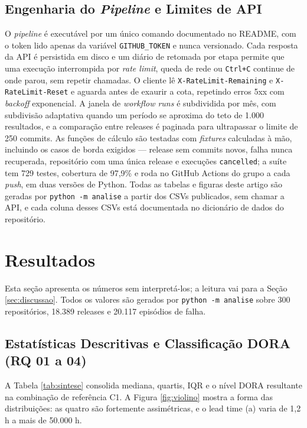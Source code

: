 \documentclass[12pt]{article}
\begin{document}
\subsection{Engenharia do \emph{Pipeline} e Limites de API}

O \emph{pipeline} é executável por um único comando documentado no README, com o token lido
apenas da variável \texttt{GITHUB\_TOKEN} e nunca versionado. Cada resposta da API é
persistida em disco e um diário de retomada por etapa permite que uma execução interrompida
por \emph{rate limit}, queda de rede ou \texttt{Ctrl+C} continue de onde parou, sem repetir
chamadas. O cliente lê \texttt{X-RateLimit-Remaining} e \texttt{X-RateLimit-Reset} e aguarda
antes de exaurir a cota, repetindo erros 5xx com \emph{backoff} exponencial. A janela de
\emph{workflow runs} é subdividida por mês, com subdivisão adaptativa quando um período se
aproxima do teto de 1.000 resultados, e a comparação entre releases é paginada para
ultrapassar o limite de 250 commits. As funções de cálculo são testadas com \emph{fixtures}
calculadas à mão, incluindo os casos de borda exigidos --- release sem commits novos, falha
nunca recuperada, repositório com uma única release e execuções \texttt{cancelled}; a suíte
tem 729 testes, cobertura de 97,9\% e roda no GitHub Actions do grupo a cada \emph{push}, em
duas versões de Python. Todas as tabelas e figuras deste artigo são geradas por
\texttt{python -m analise} a partir dos CSVs publicados, sem chamar a API, e cada coluna
desses CSVs está documentada no dicionário de dados do repositório.

\section{Resultados}
\label{sec:resultados}

Esta seção apresenta os números sem interpretá-los; a leitura vai para a Seção
\ref{sec:discussao}. Todos os valores são gerados por \texttt{python -m analise} sobre 300
repositórios, 18.389 releases e 20.117 episódios de falha.

\subsection{Estatísticas Descritivas e Classificação DORA (RQ 01 a 04)}

A Tabela \ref{tab:sintese} consolida mediana, quartis, IQR e o nível DORA resultante na
combinação de referência C1. A Figura \ref{fig:violino} mostra a forma das distribuições: as
quatro são fortemente assimétricas, e o lead time (a) varia de 1,2 h a mais de 50.000 h.
\end{document}

